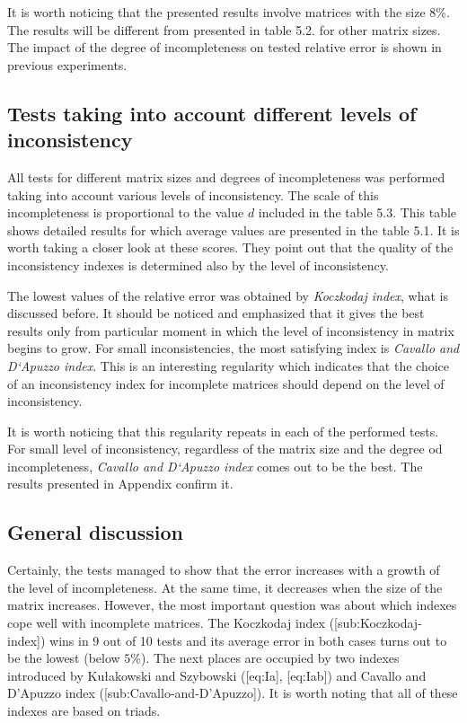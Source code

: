 It is worth noticing that the presented results involve matrices with the size $8\%$. The results will be different from presented in table 5.2. for other matrix sizes. The impact of the degree of incompleteness on tested relative error is shown in previous experiments.

\subsection{Tests taking into account different levels of inconsistency}
All tests for different matrix sizes and degrees of incompleteness was performed taking into account various levels of inconsistency. The scale of this incompleteness is proportional to the value $d$ included in the table 5.3. This table shows detailed results for which average values are presented in the table 5.1. It is worth taking a closer look at these scores. They point out that the quality of the inconsistency indexes is determined also by the level of inconsistency.

The lowest values of the relative error was obtained by \textit{Koczkodaj index}, what is discussed before. It should be noticed and emphasized that it gives the best results only from particular moment in which the level of inconsistency in matrix begins to grow. For small inconsistencies, the most satisfying index is \textit{Cavallo and D`Apuzzo index}. This is an interesting regularity which indicates that the choice of an inconsistency index for incomplete matrices should depend on the level of inconsistency. 

It is worth noticing that this regularity repeats in each of the performed tests. For small level of inconsistency, regardless of the matrix size and the degree od incompleteness, \textit{Cavallo and D`Apuzzo index} comes out to be the best. The results presented in Appendix confirm it.

\subsection{General discussion}
Certainly, the tests managed to show that the error increases with a growth of the level of incompleteness. At the same time, it decreases when the size of the matrix increases. However, the most important question was about which indexes cope well with incomplete matrices. The Koczkodaj index ([sub:Koczkodaj-index]) wins in 9 out of 10 tests and its average error in both cases turns out to be the lowest (below $5\%$). The next places are occupied by two indexes introduced by Kułakowski and Szybowski ([eq:Ia], [eq:Iab]) and Cavallo and D'Apuzzo index ([sub:Cavallo-and-D’Apuzzo]). It is worth noting that all of these indexes are based on triads.

